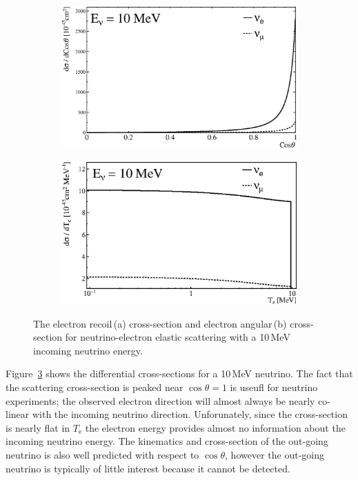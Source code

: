 \begin{figure}[htbp]
\centering
\begin{subfigure}[b]{0.57\textwidth}
\centering
\includegraphics[width=\textwidth]{neutrino_xsec_energy}
\caption[ES Recoil Energy Cross-Section]{}
\label{}
\end{subfigure}
\hfill
\begin{subfigure}[b]{0.57\textwidth}
\centering
\includegraphics[width=\textwidth]{neutrino_xsec_angular}
\caption[ES Angular Cross-Section]{}
\label{}
\end{subfigure}
\caption[Neutrino-Electron ES Cross-Sections]{The electron recoil\,(a)
cross-section and electron angular\,(b) cross-section for neutrino-electron
elastic scattering with a 10\,MeV incoming neutrino energy.}
\label{fig:es_xsec}
\end{figure}


Figure~\ref{fig:es_xsec} shows the differential cross-sections for a 10\,MeV neutrino.
The fact that the scattering cross-section is peaked near $\cos\theta=1$
is useufl for neutrino experiments; the observed electron direction
will almost always be nearly co-linear with the incoming neutrino direction.
Unforunately, since the cross-section is nearly flat in $T_{\mathrm{e}}$
the electron energy provides almost no information about the incoming neutrino
energy.
The kinematics and cross-section of the out-going neutrino is also
well predicted with respect to $\cos\theta$, however the out-going
neutrino is typically of little interest because it cannot be detected.

